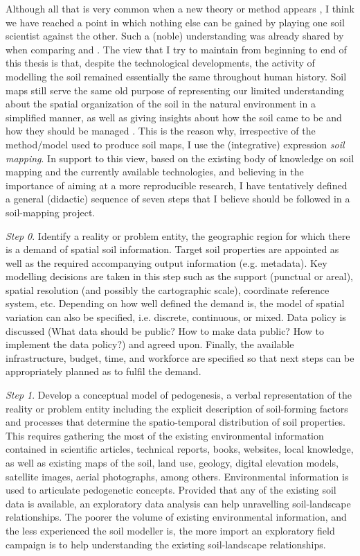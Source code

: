 Although all that is very common when a new theory or method appears
\cite{Russell1932, Feyerabend1977, Kuhn2011}, I think we have reached a point in which nothing else
can be gained by
playing one soil scientist against the other. Such a (noble) understanding was already shared by
 when comparing  and .
The view that I
try to maintain from beginning to end of this thesis is that, despite the technological developments,
the activity of modelling the soil remained essentially the same throughout human history. Soil
maps still serve the same old purpose of representing our limited understanding about the spatial
organization of the soil in the natural environment in a simplified manner, as well as giving
insights about how the soil came to be and how they should be managed
\cite{Jenny1941, Hudson1992, Legros2006, Blanco-CanquiEtAl2010, Grunwald2010}. This is the reason why,
irrespective of the method/model
used to produce soil maps, I use the (integrative) expression \emph{soil mapping}. In support to
this view, based on the existing body of knowledge on soil mapping and the currently available
technologies, and believing in the importance of aiming at a more reproducible research, I have
tentatively defined a general (didactic) sequence of seven steps that I believe should be
followed in a soil-mapping project.

\noindent\textit{Step 0}. Identify a reality or problem entity, the geographic region for which
there is a demand of spatial soil information. Target soil properties are appointed as well as the
required accompanying output information (e.g. metadata). Key modelling decisions are taken in this step
such as the support (punctual or areal), spatial resolution (and possibly the cartographic scale),
coordinate reference system, etc. Depending on how well defined the demand is, the model of spatial
variation can also be specified, i.e. discrete, continuous, or mixed. Data policy is discussed (What data
should be public? How to make data public? How to implement the data policy?) and agreed upon. Finally,
the available infrastructure, budget, time, and workforce are specified so that next steps can be
appropriately planned as to fulfil the demand.

\noindent\textit{Step 1}. Develop a conceptual model of pedogenesis, a verbal representation of the
reality or problem entity including the explicit description of soil-forming factors and processes
that determine the spatio-temporal distribution of soil properties. This requires gathering the most
of the existing environmental information contained in scientific articles, technical reports,
books, websites, local knowledge, as well as existing maps of the soil, land use, geology, digital
elevation models, satellite images, aerial photographs, among others. Environmental information is used
to articulate pedogenetic concepts. Provided that any of the existing soil data is available, an
exploratory data analysis can help unravelling soil-landscape relationships. The poorer the volume of
existing environmental information, and the less experienced the soil modeller is, the more
import an exploratory field campaign is to help understanding the existing soil-landscape relationships.

